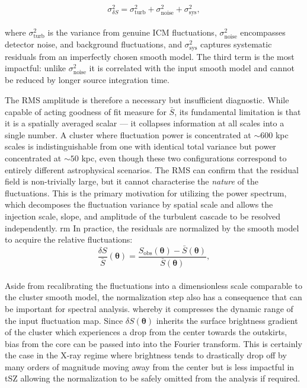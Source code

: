 \begin{equation}
	\sigma_{\delta S}^2 = \sigma_{\mathrm{turb}}^2 + \sigma_{\mathrm{noise}}^2 + \sigma_{\mathrm{sys}}^2,
	\label{eq:quadratureNoise}
\end{equation}
\\
where $\sigma_{\mathrm{turb}}^2$ is the variance from genuine ICM fluctuations, $\sigma_{\mathrm{noise}}^2$ encompasses detector noise, and background fluctuations, and $\sigma_{\mathrm{sys}}^2$ captures systematic residuals from an imperfectly chosen smooth model. The third term is the most impactful: unlike $\sigma_{\mathrm{noise}}^2$ it is correlated with the input smooth model and cannot be reduced by longer source integration time.

The RMS amplitude is therefore a necessary but insufficient diagnostic. While capable of acting goodness of fit measure for $\bar{S}$, its fundamental limitation is that it is a spatially averaged scalar — it collapses information at all scales into a single number. A cluster where fluctuation power is concentrated at $\sim 600$ kpc scales is indistinguishable from one with identical total variance but power concentrated at $\sim 50$ kpc, even though these two configurations correspond to entirely different astrophysical scenarios. The RMS can confirm that the residual field is non-trivially large, but it cannot characterise the \textit{nature} of the fluctuations. This is the primary motivation for utilizing the power spectrum, which decomposes the fluctuation variance by spatial scale and allows the injection scale, slope, and amplitude of the turbulent cascade to be resolved independently.
rm
In practice, the residuals are normalized by the smooth model to acquire the relative fluctuations:
%
\begin{equation}
	\frac{\delta S}{\bar{S}}(\boldsymbol{\theta}) = 
	\frac{S_{\mathrm{obs}}(\boldsymbol{\theta}) - 
		\bar{S}(\boldsymbol{\theta})}{\bar{S}(\boldsymbol{\theta})},
	\label{eq:fractionalFluctuations}
\end{equation}
\\ %
Aside from recalibrating the fluctuations into a dimensionless scale comparable to the cluster smooth model, the normalization step also has a consequence that can be important for spectral analysis. whereby it compresses the dynamic range of the input fluctuation map. Since $\delta S(\boldsymbol{\theta})$ inherits the surface brightness gradient of the cluster which experiences a drop from the center towards the outskirts, bias from the core can be passed into into the Fourier transform. This is certainly the case in the X-ray regime where brightness tends to drastically drop off by many orders of magnitude moving away from the center but is less impactful in tSZ  allowing the normalization to be safely omitted from the analysis if required.
